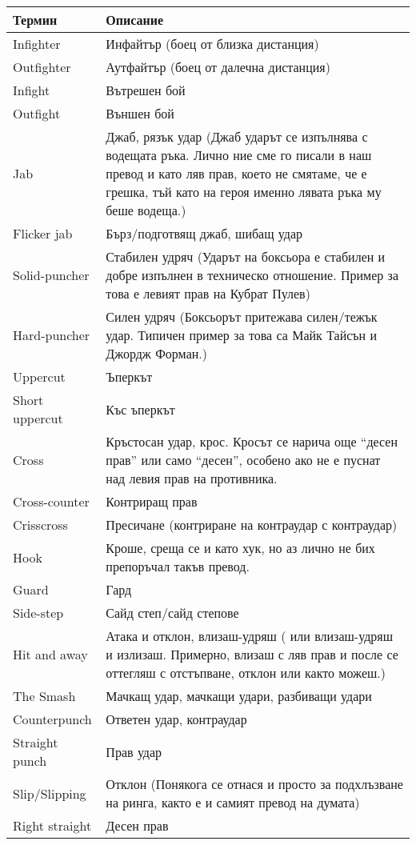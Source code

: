 \begin{longtable}{|p{}|p{}|}
\hline
\textbf{Термин} & \textbf{Описание} \\
\hline
\endhead
\hline
\endfoot
\hline
\endlastfoot
\hline
Infighter&Инфайтър (боец от близка дистанция)\\ 
Outfighter&Аутфайтър (боец от далечна дистанция)\\ 
Infight&Вътрешен бой\\ 
Outfight&Външен бой\\ 
Jab&Джаб, рязък удар (Джаб ударът се изпълнява с водещата ръка. Лично ние сме го писали в наш превод и като ляв прав, което не смятаме, че е грешка, тъй като на героя именно лявата ръка му беше водеща.)\\ 
Flicker jab&Бърз/подготвящ джаб, шибащ удар\\ 
Solid-puncher&Стабилен удряч (Ударът на боксьора е стабилен и добре изпълнен в техническо отношение. Пример за това е левият прав на Кубрат Пулев)\\ 
Hard-puncher&Силен удряч (Боксьорът притежава силен/тежък удар. Типичен пример за това са Майк Тайсън и Джордж Форман.)\\ 
Uppercut&Ъперкът\\ 
Short uppercut&Къс ъперкът\\ 
Cross&Кръстосан удар, крос. Кросът се нарича още “десен прав” или само “десен”, особено ако не е пуснат над левия прав на противника.\\ 
Cross-counter&Контриращ прав\\ 
Crisscross&Пресичане (контриране на контраудар с контраудар)\\ 
Hook&Кроше, среща се и като хук, но аз лично не бих препоръчал такъв превод.\\ 
Guard&Гард\\ 
Side-step&Сайд степ/сайд степове\\ 
Hit and away&Атака и отклон, влизаш-удряш ( или влизаш-удряш и излизаш. Примерно, влизаш с ляв прав и после се оттегляш с отстъпване, отклон или както можеш.)\\ 
The Smash&Мачкащ удар, мачкащи удари, разбиващи удари\\ 
Counterpunch&Ответен удар, контраудар\\ 
Straight punch&Прав удар\\ 
Slip/Slipping&Отклон (Понякога се отнася и просто за подхлъзване на ринга, както е и самият превод на думата)\\ 
Right straight&Десен прав\\ 

\end{longtable}
